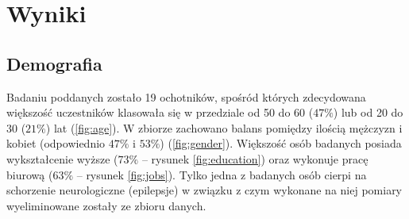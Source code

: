 \documentclass{./assets/wfis}
\begin{document}

\chapter{Wyniki}
\section{Demografia}
Badaniu poddanych zostało 19 ochotników, spośród których zdecydowana większość uczestników klasowała się w przedziale od 50 do 60 ($47\%$) lub od 20 do 30 ($21\%$) lat (\autoref{fig:age}). W zbiorze zachowano balans pomiędzy ilością mężczyzn i kobiet (odpowiednio $47\%$ i $53\%$) (\autoref{fig:gender}). Większość osób badanych posiada wykształcenie wyższe ($73\%$ – rysunek \ref{fig:education}) oraz wykonuje pracę biurową ($63\%$ – rysunek \ref{fig:jobs}). Tylko jedna z badanych osób cierpi na schorzenie neurologiczne (epilepsje) w związku z czym wykonane na niej pomiary  wyeliminowane zostały ze zbioru danych.
\end{document}
